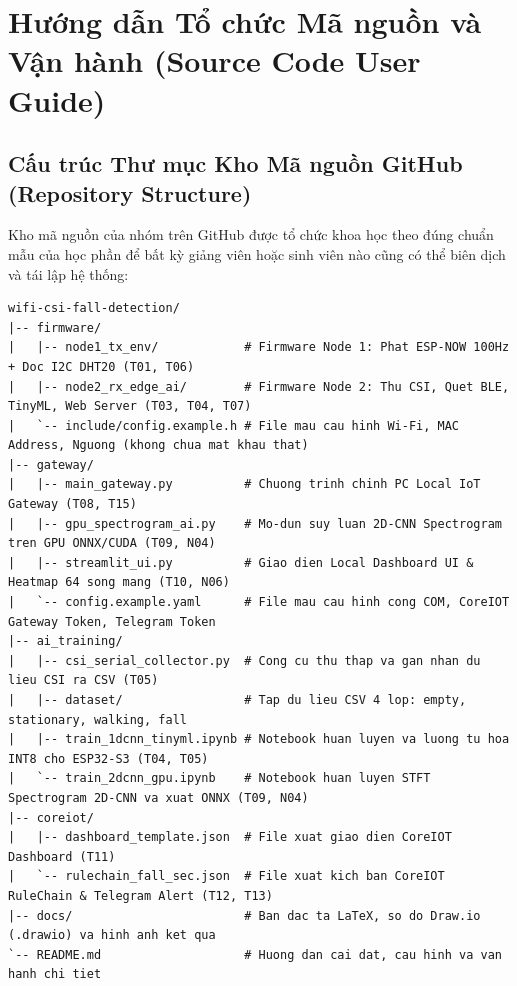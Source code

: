 \documentclass{hcmut-report}
\begin{document}
\section[Hướng dẫn Tổ chức Mã nguồn và Vận hành]{Hướng dẫn Tổ chức Mã nguồn và Vận hành (Source Code User Guide)}

\subsection[Cấu trúc Thư mục Kho Mã nguồn GitHub]{Cấu trúc Thư mục Kho Mã nguồn GitHub (Repository Structure)}
Kho mã nguồn của nhóm trên GitHub được tổ chức khoa học theo đúng chuẩn mẫu của học phần để bất kỳ giảng viên hoặc sinh viên nào cũng có thể biên dịch và tái lập hệ thống:

\begin{lstlisting}[caption={Cấu trúc thư mục dự án trên GitHub Repository}, label={lst:repo_tree}]
wifi-csi-fall-detection/
|-- firmware/
|   |-- node1_tx_env/            # Firmware Node 1: Phat ESP-NOW 100Hz + Doc I2C DHT20 (T01, T06)
|   |-- node2_rx_edge_ai/        # Firmware Node 2: Thu CSI, Quet BLE, TinyML, Web Server (T03, T04, T07)
|   `-- include/config.example.h # File mau cau hinh Wi-Fi, MAC Address, Nguong (khong chua mat khau that)
|-- gateway/
|   |-- main_gateway.py          # Chuong trinh chinh PC Local IoT Gateway (T08, T15)
|   |-- gpu_spectrogram_ai.py    # Mo-dun suy luan 2D-CNN Spectrogram tren GPU ONNX/CUDA (T09, N04)
|   |-- streamlit_ui.py          # Giao dien Local Dashboard UI & Heatmap 64 song mang (T10, N06)
|   `-- config.example.yaml      # File mau cau hinh cong COM, CoreIOT Gateway Token, Telegram Token
|-- ai_training/
|   |-- csi_serial_collector.py  # Cong cu thu thap va gan nhan du lieu CSI ra CSV (T05)
|   |-- dataset/                 # Tap du lieu CSV 4 lop: empty, stationary, walking, fall
|   |-- train_1dcnn_tinyml.ipynb # Notebook huan luyen va luong tu hoa INT8 cho ESP32-S3 (T04, T05)
|   `-- train_2dcnn_gpu.ipynb    # Notebook huan luyen STFT Spectrogram 2D-CNN va xuat ONNX (T09, N04)
|-- coreiot/
|   |-- dashboard_template.json  # File xuat giao dien CoreIOT Dashboard (T11)
|   `-- rulechain_fall_sec.json  # File xuat kich ban CoreIOT RuleChain & Telegram Alert (T12, T13)
|-- docs/                        # Ban dac ta LaTeX, so do Draw.io (.drawio) va hinh anh ket qua
`-- README.md                    # Huong dan cai dat, cau hinh va van hanh chi tiet
\end{lstlisting}
\end{document}
